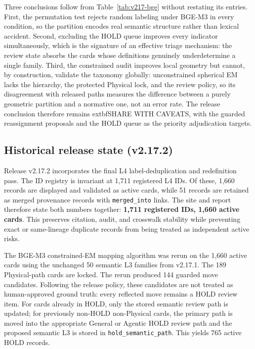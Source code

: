 \documentclass[11pt,a4paper]{article}
\newcommand{\code}[1]{\texttt{#1}}
\begin{document}
Three conclusions follow from Table~\ref{tab:v217-bge} without restating its
entries. First, the permutation test rejects random labeling under BGE-M3 in
every condition, so the partition encodes real semantic structure rather than
lexical accident. Second, excluding the HOLD queue improves every indicator
simultaneously, which is the signature of an effective triage mechanism: the
review state absorbs the cards whose definitions genuinely underdetermine a
single family. Third, the constrained audit improves local geometry but
cannot, by construction, validate the taxonomy globally: unconstrained
spherical EM lacks the hierarchy, the protected Physical lock, and the review
policy, so its disagreement with released paths measures the difference
between a purely geometric partition and a normative one, not an error rate.
The release conclusion therefore remains 	extbf{SHARE WITH CAVEATS}, with
the guarded reassignment proposals and the HOLD queue as the priority
adjudication targets.

\subsection{Historical release state (v2.17.2)}

Release v2.17.2 incorporates the final L4 label-deduplication and
redefinition pass. The ID registry is invariant at 1,711 registered L4 IDs.
Of these, 1,660 records are displayed and validated as active cards, while 51
records are retained as merged provenance records with \code{merged\_into}
links. The site and report therefore state both numbers together:
\textbf{1,711 registered IDs, 1,660 active cards}. This preserves citation,
audit, and crosswalk stability while preventing exact or same-lineage duplicate
records from being treated as independent active risks.

The BGE-M3 constrained-EM mapping algorithm was rerun on the 1,660 active
cards using the unchanged 50 semantic L3 families from v2.17.1. The 189
Physical-path cards are locked. The rerun produced 144 guarded move
candidates. Following the release policy, these candidates are not treated as
human-approved ground truth: every reflected move remains a HOLD review item.
For cards already in HOLD, only the stored semantic review path is updated; for
previously non-HOLD non-Physical cards, the primary path is moved into the
appropriate General or Agentic HOLD review path and the proposed semantic L3 is
stored in \code{hold\_semantic\_path}. This yields 765 active HOLD records.
\end{document}
